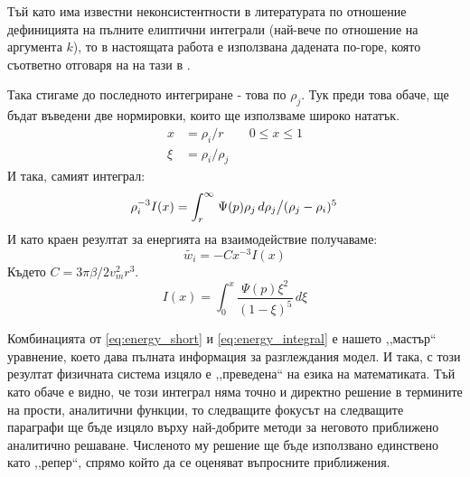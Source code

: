 Тъй като има известни неконсистентности в литературата по отношение дефиницията на пълните елиптични интеграли (най-вече по отношение на аргумента $k$), то в настоящата работа е използвана дадената по-горе, която съответно отговаря на на тази в \cite{gradshteyn}.

Така стигаме до последното интегриране - това по $\rho_j$. Тук преди това обаче, ще бъдат въведени две нормировки, които ще използваме широко нататък.
\begin{align*}
	x & = \rho_i/r &   & 0 \le x \le 1 \\
	\xi &= \rho_i/\rho_j
\end{align*}
И така, самият интеграл:
\begin{equation*}
	\rho_{i}^{-3} I(x) = \displaystyle\int_{r}^{\infty} \left. \Psi(p)\rho_j \,d\rho_j \middle/ (\rho_j-\rho_i)^5 \right.
\end{equation*}
И като краен резултат за енергията на взаимодействие получаваме:
\begin{equation}
	\tilde{w_i} = -C x^{-3} I(x) 
	\label{eq:energy_short}
\end{equation}
Където $ C = 3 \pi \beta / 2 v_{m}^2 r^3 $.
\begin{equation}
	I(x) = \displaystyle\int_{0}^{x} \frac{\Psi(p) \xi^2}{(1-\xi)^5}  \,d\xi
	\label{eq:energy_integral}
\end{equation}

Комбинацията от \autoref{eq:energy_short} и \autoref{eq:energy_integral} е нашето ,,мастър`` уравнение, което дава пълната информация за разглеждания модел.
И така, с този резултат физичната система изцяло е ,,преведена`` на езика на математиката. Тъй като обаче е видно, че този интеграл няма точно и директно решение в термините на прости, 
аналитични функции, то следващите фокусът на следващите параграфи ще бъде изцяло върху най-добрите методи за неговото приближено аналитично решаване. Численото му решение ще бъде използвано
единствено като ,,репер``, спрямо който да се оценяват въпросните приближения.


